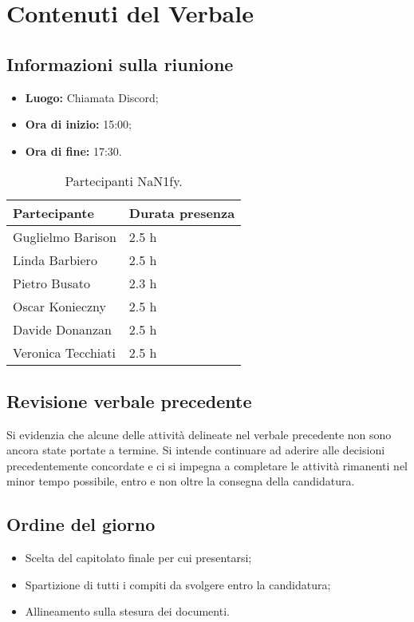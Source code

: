 \section{Contenuti del Verbale}
\subsection{Informazioni sulla riunione}
\begin{itemize}
	\setlength\itemsep{0em}
	\item\textbf{Luogo:} Chiamata Discord;
	\item\textbf{Ora di inizio:} 15:00;
	\item\textbf{Ora di fine:}  17:30.
\end{itemize}
\begin{table}[ht!]
	\begin{minipage}[t]{0.5\linewidth}
		\centering
		\begin{tabular}{p{3cm} p{3cm}}
			\toprule
			\textbf{Partecipante} & \textbf{Durata presenza} \\
			\midrule
			Guglielmo Barison & 2.5 h \\
			Linda Barbiero &  2.5 h \\
			Pietro Busato & 2.3 h \\
			Oscar Konieczny & 2.5 h \\
			Davide Donanzan & 2.5 h \\
			Veronica Tecchiati & 2.5 h \\
			\bottomrule
		\end{tabular}
		\caption{Partecipanti NaN1fy.}
		\label{table:Partecipanti NaN1fy}
	\end{minipage}
\end{table}
\subsection{Revisione verbale precedente}
Si evidenzia che alcune delle attività delineate nel verbale precedente non sono ancora state portate a termine.
Si intende continuare ad aderire alle decisioni precedentemente concordate e ci si impegna a completare le attività rimanenti nel minor tempo possibile, entro e non oltre la consegna della candidatura.
\subsection{Ordine del giorno}
\begin{itemize}
	\setlength\itemsep{0em}
	\item Scelta del capitolato finale per cui presentarsi;
	\item Spartizione di tutti i compiti da svolgere entro la candidatura;
	\item Allineamento sulla stesura dei documenti.
\end{itemize}
